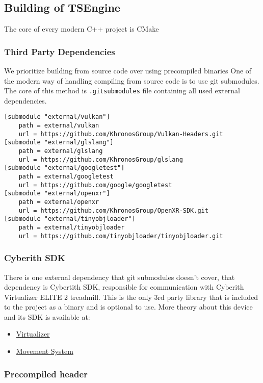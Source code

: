 \newpage
\subsection{Building of TSEngine}
\label{sec:build}
The core of every modern C++ project is CMake %

\newpage
\subsubsection{Third Party Dependencies}
\label{lst:3rdparty}
We prioritize building from source code over using precompiled binaries %
One of the modern way of handling compiling from source code is to use git submodules. The core of this method is \texttt{.gitsubmodules} file containing all used external dependencies.
\begin{lstlisting}[caption=.gitsubmodules]
[submodule "external/vulkan"]
	path = external/vulkan
	url = https://github.com/KhronosGroup/Vulkan-Headers.git
[submodule "external/glslang"]
	path = external/glslang
	url = https://github.com/KhronosGroup/glslang
[submodule "external/googletest"]
	path = external/googletest
	url = https://github.com/google/googletest
[submodule "external/openxr"]
	path = external/openxr
	url = https://github.com/KhronosGroup/OpenXR-SDK.git
[submodule "external/tinyobjloader"]
	path = external/tinyobjloader
	url = https://github.com/tinyobjloader/tinyobjloader.git
\end{lstlisting}

\newpage
\subsubsection{Cyberith SDK}
There is one external dependency that git submodules doesn't cover, that dependency is Cybertith SDK, responsible for communication with Cyberith Virtualizer ELITE 2 treadmill.
This is the only 3rd party library that is included to the project as a binary and is optional to use.
More theory about this device and its SDK is available at:
\begin{itemize}
    \item \hyperref[]{Virtualizer} %
    \item \hyperref[sec:movement_system]{Movement System}
\end{itemize}

\newpage
\subsubsection{Precompiled header}

